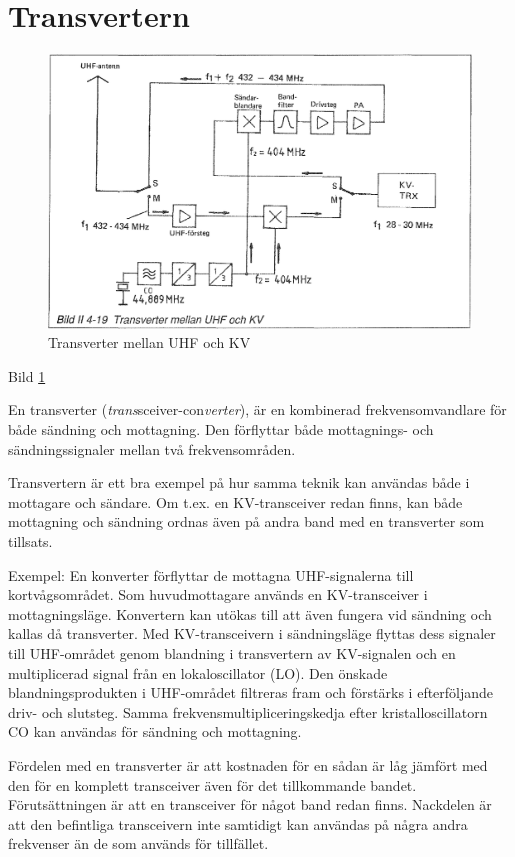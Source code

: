 \section{Transvertern}

\begin{figure}
  \includegraphics[width=\textwidth]{images/bild_2_4-19}
  \caption{Transverter mellan UHF och KV}
  \label{fig:bildII4-19}
\end{figure}

Bild \ref{fig:bildII4-19}

En transverter (\emph{trans}sceiver-con\emph{verter}), är en
kombinerad frekvensomvandlare för både sändning och mottagning. Den
förflyttar både mottagnings- och sändningssignaler mellan två
frekvensområden.

Transvertern är ett bra exempel på hur samma teknik kan användas både
i mottagare och sändare. Om t.ex. en KV-transceiver redan finns, kan
både mottagning och sändning ordnas även på andra band med en
transverter som tillsats.

Exempel: En konverter förflyttar de mottagna UHF-signalerna till
kortvågsområdet. Som huvudmottagare används en KV-transceiver i
mottagningsläge. Konvertern kan utökas till att även fungera vid
sändning och kallas då transverter. Med KV-transceivern i
sändningsläge flyttas dess signaler till UHF-området genom blandning
i transvertern av KV-signalen och en multiplicerad signal från en
lokaloscillator (LO). Den önskade blandningsprodukten i
UHF-området filtreras fram och förstärks i efterföljande driv- och
slutsteg. Samma frekvensmultipliceringskedja efter kristalloscillatorn
CO kan användas för sändning och mottagning.

Fördelen med en transverter är att kostnaden för en sådan är låg
jämfört med den för en komplett transceiver även för det tillkommande
bandet. Förutsättningen är att en transceiver för något band redan
finns.  Nackdelen är att den befintliga transceivern inte samtidigt
kan användas på några andra frekvenser än de som används för
tillfället.
